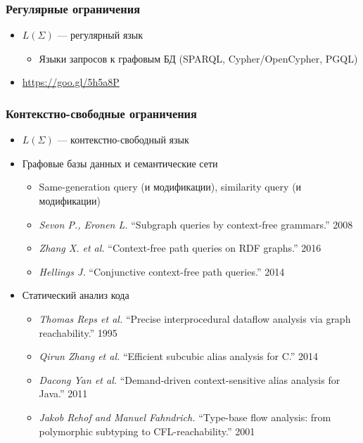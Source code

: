 \documentclass[xcolor=table,aspectratio=169]{beamer}
\begin{document}
\begin{frame}[fragile]
  \transwipe[direction=90]
  \frametitle{Регулярные ограничения}
  \begin{itemize}
  \item $L(\Sigma)$ --- регулярный язык
    \begin{itemize}
      \item Языки запросов к графовым БД (SPARQL, Cypher/OpenCypher, PGQL)
    \end{itemize}
  \item \url{https://goo.gl/5h5a8P}
  \end{itemize}
\end{frame}


\begin{frame}[fragile]
  \transwipe[direction=90]
  \frametitle{Контекстно-свободные ограничения}
  \begin{itemize}
  \item $L(\Sigma)$ --- контекстно-свободный язык
  \item Графовые базы данных и семантические сети
    \begin{itemize}
        \item Same-generation query (и модификации), similarity query (и модификации)
        \item \emph{Sevon P., Eronen L.} ``Subgraph queries by context-free grammars.'' 2008
        \item \emph{Zhang X. et al.} ``Context-free path queries on RDF graphs.'' 2016
        \item \emph{Hellings J.} ``Conjunctive context-free path queries.'' 2014
    \end{itemize}
    \item Статический анализ кода
    \begin{itemize}
        \item \emph{Thomas Reps et al.} ``Precise interprocedural dataflow analysis via graph reachability.'' 1995 
        \item \emph{Qirun Zhang et al.}  ``Efficient subcubic alias analysis for C.'' 2014
        \item \emph{Dacong Yan et al.} ``Demand-driven context-sensitive alias analysis for Java.'' 2011
        \item \emph{Jakob Rehof and Manuel Fahndrich.} ``Type-base flow analysis: from polymorphic subtyping to CFL-reachability.'' 2001
    \end{itemize}
  \end{itemize}
\end{frame}
\end{document}

